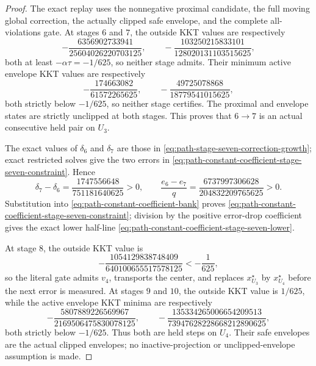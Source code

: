 \begin{proof}
The exact replay uses the nonnegative proximal candidate, the full moving
global correction, the actually clipped safe envelope, and the complete
all-violations gate.  At stages $6$ and $7$, the outside KKT values are
respectively
\begin{equation*}
 -\frac{6356902733941}{25604026220703125},
 \qquad
 -\frac{103250215833101}{128020131103515625},
\end{equation*}
both at least $-\alpha\tau=-1/625$, so neither stage admits.  Their minimum
active envelope KKT values are respectively
\begin{equation*}
 -\frac{174663082}{61572265625},
 \qquad
 -\frac{49725078868}{18779541015625},
\end{equation*}
both strictly below $-1/625$, so neither stage certifies.  The proximal and
envelope states are strictly unclipped at both stages.  This proves that
$6\to7$ is an actual consecutive held pair on $U_3$.

The exact values of $\delta_6$ and $\delta_7$ are those in
\cref{eq:path-stage-seven-correction-growth}; exact restricted solves give
the two errors in
\cref{eq:path-constant-coefficient-stage-seven-constraint}.  Hence
\begin{equation*}
 \delta_7-\delta_6
 =\frac{1747556648}{751181640625}>0,
 \qquad
 \frac{e_6-e_7}{q}
 =\frac{6737997306628}{204832209765625}>0.
\end{equation*}
Substitution into \cref{eq:path-constant-coefficient-bank} proves
\cref{eq:path-constant-coefficient-stage-seven-constraint}; division by the
positive error-drop coefficient gives the exact lower half-line
\cref{eq:path-constant-coefficient-stage-seven-lower}.

At stage $8$, the outside KKT value is
\begin{equation*}
 -\frac{1054129838748409}{640100655517578125}<-\frac{1}{625},
\end{equation*}
so the literal gate admits $v_4$, transports the center, and replaces
$x_{U_3}^\star$ by $x_{U_4}^\star$ before the next error is measured.
At stages $9$ and $10$, the outside KKT value is $1/625$, while the active
envelope KKT minima are respectively
\begin{equation*}
 -\frac{5807889226569967}{2169506475830078125},
 \qquad
 -\frac{135334265006654209513}{73947628228668212890625},
\end{equation*}
both strictly below $-1/625$.  Thus both are held steps on $U_4$.  Their
safe envelopes are the actual clipped envelopes; no inactive-projection or
unclipped-envelope assumption is made.


\end{proof}
